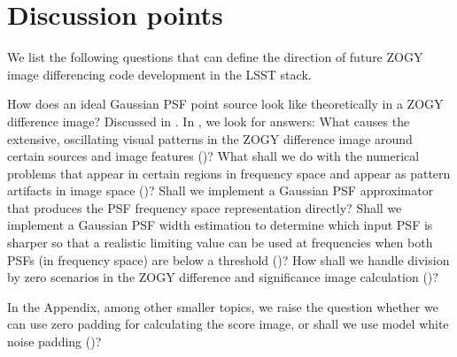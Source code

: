 \documentclass[11pt]{article}
\begin{document}
\section{Discussion points}
We list the following questions that can define the direction of future
ZOGY image differencing code development in the LSST stack.
%
\par How does an ideal Gaussian PSF point source look like theoretically in
a ZOGY difference image? Discussed in .  In
, we look for answers: What causes the extensive,
oscillating visual patterns in the ZOGY difference image around certain
sources and image features ()? What shall we do with the
numerical problems that appear in certain regions in frequency space and
appear as pattern artifacts in image space ()? Shall we
implement a Gaussian PSF approximator that produces the PSF frequency space
representation directly?  Shall we implement a Gaussian PSF width estimation
to determine which input PSF is sharper so that a realistic limiting value
can be used at frequencies when both PSFs (in frequency space) are below a
threshold ()?  How shall we handle
division by zero scenarios in the ZOGY difference and significance image
calculation ()?
%
\par In the Appendix, among other smaller topics, we raise the question whether
we can use zero padding for calculating the score image, or shall we use
model white noise padding ()?
%
\end{document}
